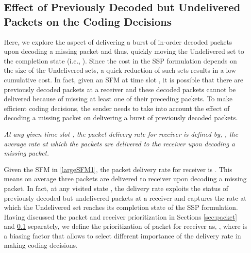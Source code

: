 \documentclass[12pt, peerreview, onecolumn]{IEEEtran}
\begin{document}
\vspace{-5mm}
\subsection{Effect of  Previously Decoded but Undelivered Packets on the Coding Decisions}\label{sec:receiver}

Here, we explore the aspect of  delivering a burst of in-order decoded packets upon decoding a missing packet and thus,  quickly moving the Undelivered set to the completion state (i.e., ). Since the cost in the SSP formulation depends on  the size of the Undelivered sets, a quick reduction of such sets results in  a low cumulative cost. In fact, given an SFM at  time slot , it is possible that there are previously decoded packets at a receiver and these decoded packets cannot be delivered  because of missing at least one
of their preceding packets. To make efficient coding decisions, the sender  needs to take into account the effect of decoding  a missing packet on delivering  a burst of previously decoded packets. 

\begin{definitions}
\emph{At any given time slot , the packet delivery rate for  receiver  is defined by, , the average rate at which the packets are  delivered to the receiver upon decoding a missing packet.\footnotemark}
\end{definitions}



Given the SFM in \eqref{largeSFM1}, the packet delivery rate for receiver  is . This means  on average three packets are delivered to receiver  upon decoding a missing packet.
In fact, at any visited state , the delivery rate exploits the  status of previously decoded but undelivered  packets at a receiver and  captures the rate at which the Undelivered set reaches  its completion state of the SSP formulation. Having discussed the  packet and receiver prioritization in Sections \ref{sec:packet} and \ref{sec:receiver} separately, we define the prioritization of packet  for receiver  as,  , where  is a biasing factor that  allows to select different importance of the delivery rate in making coding decisions.
\end{document}
